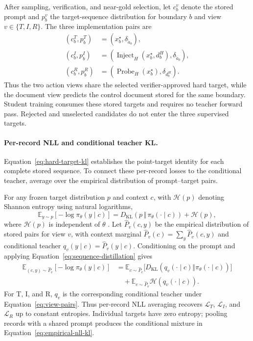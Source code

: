 \documentclass{article}
\begin{document}
After sampling, verification, and near-gold selection, let $c_b^v$ denote the
stored prompt and $p_b^v$ the target-sequence distribution for boundary $b$
and view $v\in\{T,I,R\}$. The three implementation pairs are
\begin{equation}
\begin{aligned}
(c_b^T,p_b^T)
&=\left(x_b^\star,\delta_{\tilde a_b}\right),\\
(c_b^I,p_b^I)
&=\left(\operatorname{Inject}_H(x_b^\star,d_b^H),
\delta_{\tilde a_b}\right),\\
(c_b^R,p_b^R)
&=\left(\operatorname{Probe}_H(x_b^\star),\delta_{d_b^H}\right).
\end{aligned}
\label{eq:view-pairs}
\end{equation}
Thus the two action views share the selected verifier-approved hard target,
while the document view predicts the control document stored for the same
boundary. Student training consumes these stored targets and requires no
teacher forward pass. Rejected and unselected candidates do not enter the
three supervised targets.

\paragraph{Per-record NLL and conditional teacher KL.}
Equation~\ref{eq:hard-target-kl} establishes the point-target identity for
each complete stored sequence. To connect these per-record losses to the
conditional teacher, average over the empirical distribution of prompt--target
pairs.

For any frozen target distribution $p$ and context $c$, with $\mathcal H(p)$
denoting Shannon entropy using natural logarithms,
\begin{equation}
\mathbb E_{y\sim p}\left[-\log\pi_\theta(y\mid c)\right]
=D_{\mathrm{KL}}\!\left(p\,\Vert\,\pi_\theta(\cdot\mid c)\right)
+\mathcal H(p),
\label{eq:sequence-distillation}
\end{equation}
where $\mathcal H(p)$ is independent of $\theta$ \citep{kim2016sequence}.
Let $\widehat P_v(c,y)$ be the empirical distribution of stored pairs for
view $v$, with context marginal $\widehat P_v(c)=\sum_y\widehat P_v(c,y)$
and conditional teacher $q_v(y\mid c)=\widehat P_v(y\mid c)$. Conditioning
on the prompt and applying Equation~\ref{eq:sequence-distillation} gives
\begin{equation}
\begin{aligned}
\mathbb E_{(c,y)\sim\widehat P_v}[-\log\pi_\theta(y\mid c)]
&=\mathbb E_{c\sim\widehat P_v}\bigl[
D_{\mathrm{KL}}(q_v(\cdot\mid c)\Vert\pi_\theta(\cdot\mid c))\bigr]\\
&\quad+\mathbb E_{c\sim\widehat P_v}
\mathcal H(q_v(\cdot\mid c)).
\end{aligned}
\label{eq:empirical-nll-kl}
\end{equation}
For T, I, and R, $q_v$ is the corresponding conditional teacher under
Equation~\ref{eq:view-pairs}. Thus per-record NLL averaging recovers
$\mathcal L_T$, $\mathcal L_I$, and $\mathcal L_R$ up to constant entropies.
Individual targets have zero entropy; pooling records with a shared prompt
produces the conditional mixture in Equation~\ref{eq:empirical-nll-kl}.
\end{document}
